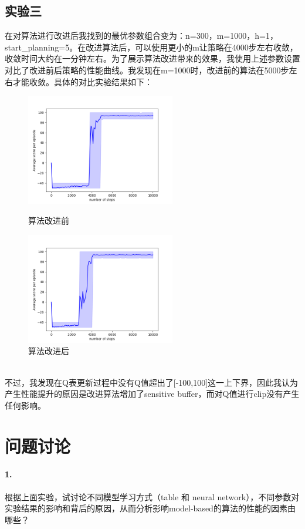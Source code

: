\documentclass[a4paper,12pt]{article}
\begin{document}
\begin{CJK}{UTF8}{gbsn}
\subsection{实验三}
在对算法进行改进后我找到的最优参数组合变为：n=300，m=1000，h=1，\\start\_planning=5。在改进算法后，可以使用更小的m让策略在4000步左右收敛，收敛时间大约在一分钟左右。为了展示算法改进带来的效果，我使用上述参数设置对比了改进前后策略的性能曲线。我发现在m=1000时，改进前的算法在5000步左右才能收敛。具体的对比实验结果如下：
\begin{figure}[htbp]
	\centering
	\begin{minipage}[t]{0.45\textwidth}
		\centering
		\includegraphics[width=6.5cm]{resource/nn-m=1000/performance.png}
		\caption{算法改进前}
	\end{minipage}
	\begin{minipage}[t]{0.45\textwidth}
		\centering
		\includegraphics[width=6.5cm]{resource/advnn-m=1000/performance.png}
		\caption{算法改进后}
	\end{minipage}
\end{figure}
\\不过，我发现在Q表更新过程中没有Q值超出了[-100,100]这一上下界，因此我认为产生性能提升的原因是改进算法增加了sensitive buffer，而对Q值进行clip没有产生任何影响。
\section{问题讨论}
\paragraph{1.}根据上面实验，试讨论不同模型学习方式（table 和 neural network），不同参数对实验结果的影响和背后的原因，从而分析影响model-based的算法的性能的因素由哪些？



\end{CJK}
\end{document}
